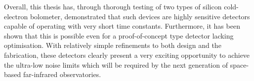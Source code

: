 \par 
Overall, this thesis has, through thorough testing of two types of silicon cold-electron bolometer, demonstrated that such devices are highly sensitive detectors capable of operating with very short time constants. Furthermore, it has been shown that this is possible even for a proof-of-concept type detector lacking optimisation. With relatively simple refinements to both design and the fabrication, these detectors clearly present a very exciting opportunity to achieve the ultra-low noise limits which will be required by the next generation of space-based far-infrared observatories.

 
